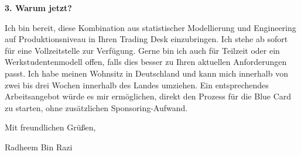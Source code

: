 \documentclass[11pt,a4paper]{coverletter}
\begin{document}
\vspace{8pt}\noindent\textbf{3. Warum jetzt?}\par\vspace{3pt}

Ich bin bereit, diese Kombination aus statistischer Modellierung und Engineering auf Produktionsniveau in Ihren Trading Desk einzubringen. Ich stehe ab sofort für eine Vollzeitstelle zur Verfügung. Gerne bin ich auch für Teilzeit oder ein Werkstudentenmodell offen, falls dies besser zu Ihren aktuellen Anforderungen passt. Ich habe meinen Wohnsitz in Deutschland und kann mich innerhalb von zwei bis drei Wochen innerhalb des Landes umziehen. Ein entsprechendes Arbeitsangebot würde es mir ermöglichen, direkt den Prozess für die Blue Card zu starten, ohne zusätzlichen Sponsoring-Aufwand.

\closing{Mit freundlichen Grüßen,}{Radheem Bin Razi}
\end{document}
